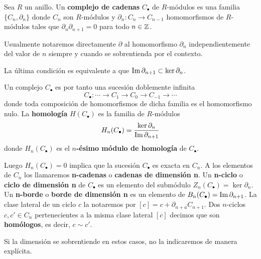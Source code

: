 \begin{definicion}
	Sea \(R\) un anillo. Un \textbf{complejo de cadenas} \(C_{\bullet}\) de \(R\)-módulos
	es una familia \(\{C_{n}, \partial_{n}\}\) donde \(C_{n}\) son \(R\)-módulos y \(\partial
	_{n}: C_{n}\rightarrow C_{n-1}\) homomorfismos de \(R\)-módulos tales que \(\partial
	_{n}\partial_{n+1}= 0\) para todo \(n \in \mathbb{Z}\).
\end{definicion}
\begin{nota}
	Usualmente notaremos directamente \(\partial\) al homomorfismo \(\partial_{n}\) independientemente
	del valor de \(n\) siempre y cuando se sobrentienda por el contexto.
\end{nota}
\begin{observacion}
	La última condición es equivalente a que \(\operatorname{Im}{\partial_{n+1}}\subset \ker{\partial_n}\).
\end{observacion}
Un complejo \(C_{\bullet}\) es por tanto una sucesión doblemente infinita
\[
C_{\bullet}: \cdots \rightarrow C_{1}\rightarrow C_{0}\rightarrow C_{-1}\rightarrow
\cdots
\]
donde toda composición de homomorfismos de dicha familia es el homomorfismo nulo.
La \textbf{homología} \(H(C_{\bullet})\) es la familia de \(R\)-módulos
\[
H_{n}(C_{\bullet}) = \frac{\ker \partial_{n}}{\operatorname{Im} \partial_{n+1}}
\]
donde \(H_{n}(C_{\bullet})\) es el \textbf{\(n\)-ésimo módulo de homología} de
\(C_{\bullet}\).

Luego \(H_{n}(C_{\bullet})=0\) implica que la sucesión \(C_{\bullet}\) es exacta en
\(C_{n}\). A los elementos de \(C_{n}\) los llamaremos \textbf{n-cadenas} o \textbf{cadenas
	de dimensión n}. Un \textbf{n-ciclo} o \textbf{ciclo de dimensión n} de
\(C_{\bullet}\) es un elemento del submódulo
\(Z_{n}(C_{\bullet}) = \ker \partial_{n}\). Un \textbf{n-borde} o \textbf{borde de
	dimensión n} es un elemento de \(B_{n}(C_{\bullet})= \operatorname{Im}{\partial_{n+1}}\). La
clase lateral de un ciclo \(c\) la notaremos por \([c] = c + \partial_{n+a}C_{n+1}\).
Dos \(n\)-ciclos \(c,c' \in C_{n}\) pertenecientes a la misma clase lateral \([c]\) decimos
que son \textbf{homólogos}, es decir, \(c \sim c'\).

\begin{nota}
	Si la dimensión se sobrentiende en estos casos, no la indicaremos de manera
	explícita.
\end{nota}

